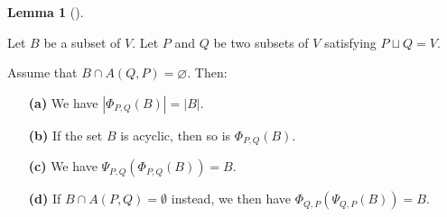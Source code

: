 \documentclass[numbers=enddot,12pt,final,onecolumn,notitlepage]{scrartcl}%
\theoremstyle{definition}
\newtheorem{lem}[theo]{Lemma}
\newenvironment{lemma}[1][]
{\begin{lem}[#1]\begin{leftbar}}
{\end{leftbar}\end{lem}}
\theoremstyle{plainsl}
\begin{document}
\begin{lemma}
\label{lem.realignment-acyc}Let $B$ be a subset of $V$. Let $P$ and $Q$ be two
subsets of $V$ satisfying $P\sqcup Q=V$.

Assume that $B\cap A\left(  Q,P\right)  =\varnothing$. Then:

\begin{enumerate}
\item[\textbf{(a)}] We have $\left\vert \Phi_{P,Q}\left(  B\right)
\right\vert =\left\vert B\right\vert $.

\item[\textbf{(b)}] If the set $B$ is acyclic, then so is $\Phi_{P,Q}\left(
B\right)  $.

\item[\textbf{(c)}] We have $\Psi_{P,Q}\left(  \Phi_{P,Q}\left(  B\right)
\right)  =B$.

\item[\textbf{(d)}] If $B \cap A(P,Q) = \emptyset$ instead, we then have
$\Phi_{Q,P}\left(  \Psi_{Q,P}\left(  B \right)  \right)  = B$.
\end{enumerate}
\end{lemma}
\end{document}
